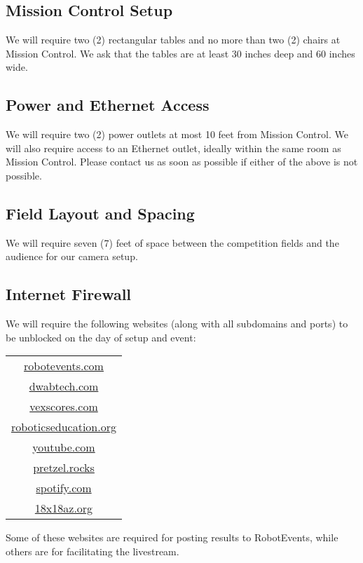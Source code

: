 \documentclass[12pt]{article}
\begin{document}
\subsection{Mission Control Setup}
We will require two (2) rectangular tables and no more than two (2) chairs at Mission Control.
We ask that the tables are at least 30 inches deep and 60 inches wide.

\subsection{Power and Ethernet Access}
We will require two (2) power outlets at most 10 feet from Mission Control.
We will also require access to an Ethernet outlet, ideally within the same room as Mission Control.
Please contact us as soon as possible if either of the above is not possible.

\subsection{Field Layout and Spacing}
We will require seven (7) feet of space between the competition fields and the audience for our camera setup.

\subsection{Internet Firewall}
We will require the following websites (along with all subdomains and ports) to be unblocked on the day of setup and event:

\begin{centering}

\begin{tabular}{|c|}
    \hline
    \url{robotevents.com} \\
    \url{dwabtech.com} \\
    \url{vexscores.com} \\
    \url{roboticseducation.org}\\
    \url{youtube.com}\\ 
        \url{pretzel.rocks} \\
        \url{spotify.com}\\
        \url{18x18az.org} \\
    \hline
\end{tabular}

\end{centering}
\vspace{1em}

\noindent Some of these websites are required for posting results to RobotEvents, while others are for facilitating the livestream.
\end{document}
